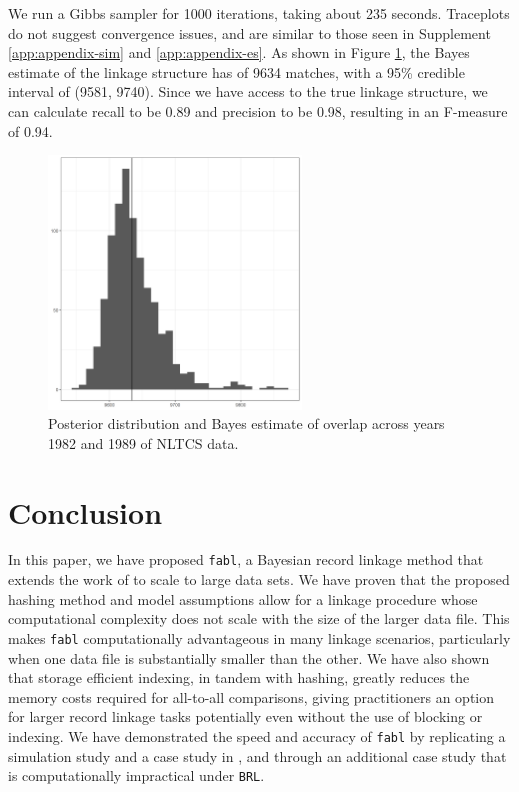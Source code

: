\documentclass[ba]{imsart}
\begin{document}
	We run a Gibbs sampler for 1000 iterations, taking about 235 seconds. Traceplots do not suggest convergence issues, and are similar to those seen in Supplement \ref{app:appendix-sim} and \ref{app:appendix-es}. As shown in Figure \ref{fig:nltcs-overlap-plot}, the Bayes estimate of the linkage structure has of 9634 matches, with a 95\% credible interval of (9581, 9740). Since we have access to the true linkage structure, we can calculate recall to be 0.89 and precision to be 0.98, resulting in an F-measure of 0.94. 
	
	\begin{figure}
		\begin{center}
			\includegraphics[width=0.6\textwidth]{../notes/figures/nltcs/overlap_posterior4}
			\caption{Posterior distribution and Bayes estimate of overlap across years 1982 and 1989 of NLTCS data.}
			\label{fig:nltcs-overlap-plot}
		\end{center}
	\end{figure}
	
		
	\section{Conclusion}
	\label{discussion}
	
	In this paper, we have proposed \texttt{fabl}, a Bayesian record linkage method that extends the work of \cite{sadinle_bayesian_2017} to scale to large data sets. We have proven that the proposed hashing method and model assumptions allow for a linkage procedure whose computational complexity does not scale with the size of the larger data file. This makes \texttt{fabl} computationally advantageous in many linkage scenarios, particularly when one data file is substantially smaller than the other. We have also shown that storage efficient indexing, in tandem with hashing, greatly reduces the memory costs required for all-to-all comparisons, giving practitioners an option for larger record linkage tasks potentially even without the use of blocking or indexing. We have demonstrated the speed and accuracy of \texttt{fabl} by replicating a simulation study and a case study in \cite{sadinle_bayesian_2017}, and through an additional case study that is computationally impractical under \texttt{BRL}. 
	
\end{document}
